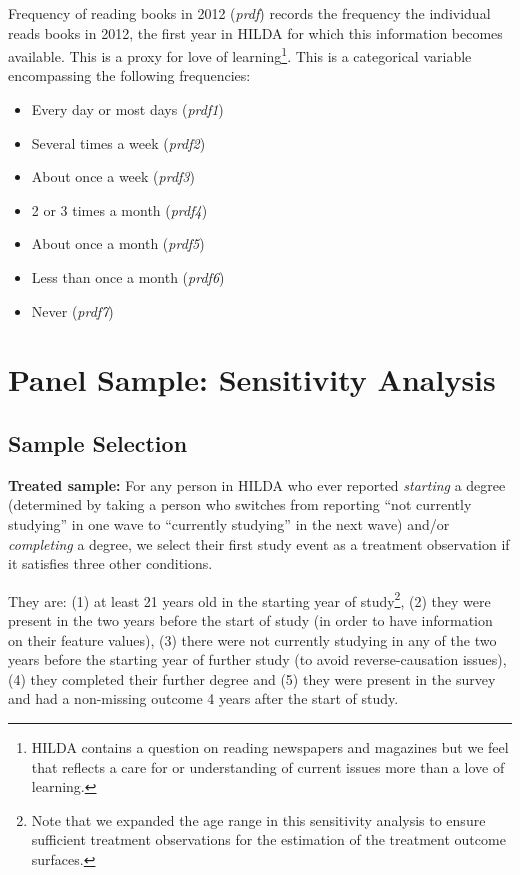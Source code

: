 \documentclass[12pt, a4paper]{article}
\begin{document}
Frequency of reading books in 2012 (\textit{p\textunderscore{}rdf}) records the frequency the individual reads books in 2012, the first year in HILDA for which this information becomes available. This is a proxy for love of learning\footnote{HILDA contains a question on reading newspapers and magazines but we feel that reflects a care for or understanding of current issues more than a love of learning.}. This is a categorical variable encompassing the following frequencies:
\begin{itemize}
  \item Every day or most days (\textit{p\textunderscore{}rdf1}) 
  \item Several times a week (\textit{p\textunderscore{}rdf2}) 
  \item About once a week (\textit{p\textunderscore{}rdf3}) 
  \item 2 or 3 times a month (\textit{p\textunderscore{}rdf4}) 
  \item About once a month (\textit{p\textunderscore{}rdf5}) 
  \item Less than once a month (\textit{p\textunderscore{}rdf6}) 
  \item Never (\textit{p\textunderscore{}rdf7}) 
\end{itemize}

\clearpage

\section{Panel Sample: Sensitivity Analysis}

\subsection{Sample Selection}

\textbf{Treated sample:} For any person in HILDA who ever reported \textit{starting} a degree (determined by taking a person who switches from reporting “not currently studying” in one wave to “currently studying” in the next wave) and/or \textit{completing} a degree, we select their first study event as a treatment observation if it satisfies three other conditions.

They are: (1) at least 21 years old in the starting year of study\footnote{Note that we expanded the age range in this sensitivity analysis to ensure sufficient treatment observations for the estimation of the treatment outcome surfaces.}, (2) they were present in the two years before the start of study (in order to have information on their feature values), (3) there were not currently studying in any of the two years before the starting year of further study (to avoid reverse-causation issues), (4) they completed their further degree and (5) they were present in the survey and had a non-missing outcome 4 years after the start of study. 
\end{document}
